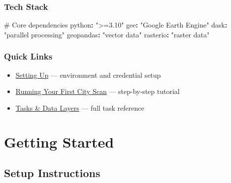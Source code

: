 \documentclass[
  letterpaper,
  DIV=11,
  numbers=noendperiod]{scrreprt}
\newenvironment{Shaded}{\begin{snugshade}}{\end{snugshade}}
\newcommand{\AttributeTok}[1]{\textcolor[rgb]{0.40,0.45,0.13}{#1}}
\newcommand{\CommentTok}[1]{\textcolor[rgb]{0.37,0.37,0.37}{#1}}
\newcommand{\FunctionTok}[1]{\textcolor[rgb]{0.28,0.35,0.67}{#1}}
\newcommand{\KeywordTok}[1]{\textcolor[rgb]{0.00,0.23,0.31}{\textbf{#1}}}
\newcommand{\StringTok}[1]{\textcolor[rgb]{0.13,0.47,0.30}{#1}}
\providecommand{\tightlist}{%
  \setlength{\itemsep}{0pt}\setlength{\parskip}{0pt}}
\begin{document}
\section{Tech Stack}\label{tech-stack}

\begin{Shaded}
\begin{Highlighting}[]
\CommentTok{\# Core dependencies}
\FunctionTok{python}\KeywordTok{:}\AttributeTok{ }\StringTok{"\textgreater{}=3.10"}
\FunctionTok{gee}\KeywordTok{:}\AttributeTok{ }\StringTok{"Google Earth Engine"}
\FunctionTok{dask}\KeywordTok{:}\AttributeTok{ }\StringTok{"parallel processing"}
\FunctionTok{geopandas}\KeywordTok{:}\AttributeTok{ }\StringTok{"vector data"}
\FunctionTok{rasterio}\KeywordTok{:}\AttributeTok{ }\StringTok{"raster data"}
\end{Highlighting}
\end{Shaded}

\section{Quick Links}\label{quick-links}

\begin{tcolorbox}[enhanced jigsaw, arc=.35mm, bottomrule=.15mm, bottomtitle=1mm, breakable, colback=white, colbacktitle=quarto-callout-note-color!10!white, colframe=quarto-callout-note-color-frame, coltitle=black, left=2mm, leftrule=.75mm, opacityback=0, opacitybacktitle=0.6, rightrule=.15mm, title=\textcolor{quarto-callout-note-color}{\faInfo}\hspace{0.5em}{Note}, titlerule=0mm, toprule=.15mm, toptitle=1mm]

\begin{itemize}
\tightlist
\item
  \href{setting-up.qmd}{Setting Up} --- environment and credential setup
\item
  \href{running-first-cityscan.qmd}{Running Your First City Scan} ---
  step-by-step tutorial
\item
  \href{tasks-structure-overview.qmd}{Tasks \& Data Layers} --- full
  task reference
\end{itemize}

\end{tcolorbox}

\part{Getting Started}

\chapter{Setup Instructions}\label{setup-instructions}
\end{document}
